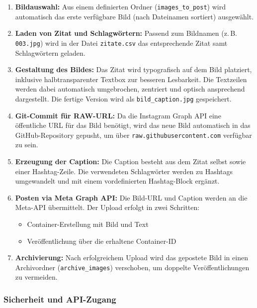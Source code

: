 \documentclass[a4paper,12pt]{article}
\begin{document}
\begin{enumerate}
    \item \textbf{Bildauswahl:} Aus einem definierten Ordner (\texttt{images\_to\_post}) wird automatisch das erste verfügbare Bild (nach Dateinamen sortiert) ausgewählt.
    
    \item \textbf{Laden von Zitat und Schlagwörtern:} Passend zum Bildnamen (z.\,B. \texttt{003.jpg}) wird in der Datei \texttt{zitate.csv} das entsprechende Zitat samt Schlagwörtern geladen.
    
    \item \textbf{Gestaltung des Bildes:} Das Zitat wird typografisch auf dem Bild platziert, inklusive halbtransparenter Textbox zur besseren Lesbarkeit. Die Textzeilen werden dabei automatisch umgebrochen, zentriert und optisch ansprechend dargestellt. Die fertige Version wird als \texttt{bild\_caption.jpg} gespeichert.
    
    \item \textbf{Git-Commit für RAW-URL:} Da die Instagram Graph API eine öffentliche URL für das Bild benötigt, wird das neue Bild automatisch in das GitHub-Repository gepusht, um über \texttt{raw.githubusercontent.com} verfügbar zu sein.
    
    \item \textbf{Erzeugung der Caption:} Die Caption besteht aus dem Zitat selbst sowie einer Hashtag-Zeile. Die verwendeten Schlagwörter werden zu Hashtags umgewandelt und mit einem vordefinierten Hashtag-Block ergänzt.
    
    \item \textbf{Posten via Meta Graph API:} Die Bild-URL und Caption werden an die Meta-API übermittelt. Der Upload erfolgt in zwei Schritten:
    \begin{itemize}
        \item Container-Erstellung mit Bild und Text
        \item Veröffentlichung über die erhaltene Container-ID
    \end{itemize}
    
    \item \textbf{Archivierung:} Nach erfolgreichem Upload wird das gepostete Bild in einen Archivordner (\texttt{archive\_images}) verschoben, um doppelte Veröffentlichungen zu vermeiden.
\end{enumerate}

\subsubsection*{Sicherheit und API-Zugang}
\end{document}

